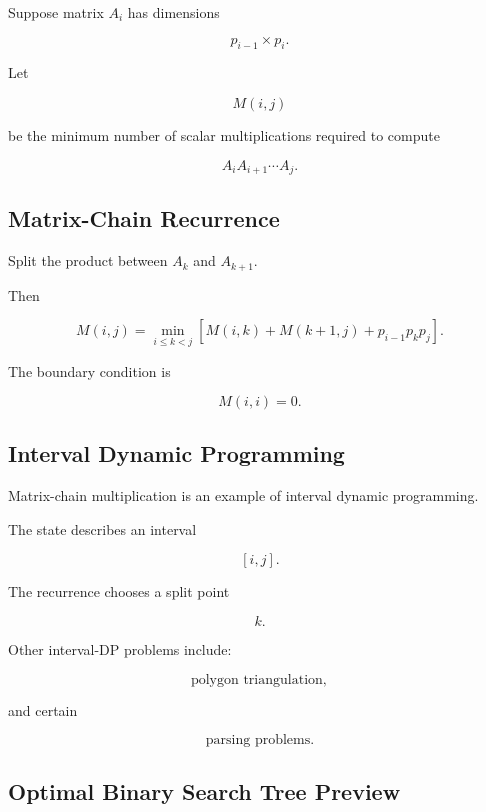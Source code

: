Suppose matrix \(A_i\) has dimensions

\[
p_{i-1}\times p_i.
\]

Let

\[
M(i,j)
\]

be the minimum number of scalar multiplications required to compute

\[
A_iA_{i+1}\cdots A_j.
\]

\subsection{Matrix-Chain Recurrence}
\label{subsec:matrix-chain-recurrence}

Split the product between \(A_k\) and \(A_{k+1}\).

Then

\[
\boxed{
M(i,j)
=
\min_{i\leq k<j}
\left[
M(i,k)
+
M(k+1,j)
+
p_{i-1}p_kp_j
\right].
}
\]

The boundary condition is

\[
\boxed{
M(i,i)=0.
}
\]

\subsection{Interval Dynamic Programming}
\label{subsec:interval-dynamic-programming}

Matrix-chain multiplication is an example of interval dynamic programming.

The state describes an interval

\[
[i,j].
\]

The recurrence chooses a split point

\[
k.
\]

Other interval-DP problems include:

\[
\boxed{
\text{polygon triangulation},
}
\]

and certain

\[
\boxed{
\text{parsing problems}.
}
\]

\subsection{Optimal Binary Search Tree Preview}
\label{subsec:optimal-binary-search-tree-preview}

